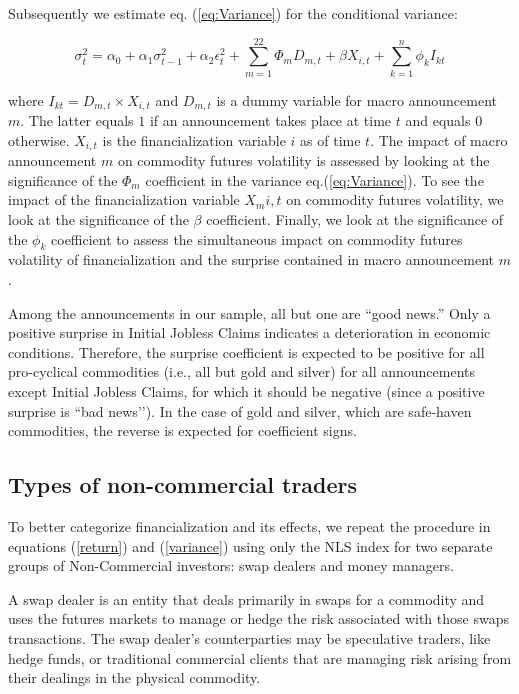 \documentclass[12pt]{article}
\begin{document}
Subsequently we estimate  eq. (\ref{eq:Variance}) for the conditional variance:

\begin{equation}\label{eq:Variance}
\sigma_{t}^2=\alpha_0+\alpha_1 \sigma_{t-1}^2+\alpha_2 \epsilon_t^2 +\sum_{m=1}^{22} \Phi_m D_{m,t}+\beta X_{i,t}+\sum_{k=1}^n \phi_k I_{kt}
\end{equation}

where $I_{kt}=D_{m,t} \times X_{i,t}$ and $D_{m,t}$ is a dummy variable for macro announcement $m$. The  latter equals $1$ if an announcement takes place at time $t$ and equals 0 otherwise. $X_{i,t}$  is the financialization variable $i$ as of  time $t$. The impact of macro announcement $m$ on commodity futures volatility is assessed by looking at the significance of the $\Phi_m$ coefficient in the variance eq.(\ref{eq:Variance}). To see the impact of the financialization variable $X_m{i,t}$ on commodity futures volatility, we look at the significance of the  $\beta$ coefficient. Finally, we look at the significance of the  $\phi_k$ coefficient to assess the simultaneous impact on commodity futures volatility of  financialization  and the surprise contained in macro announcement $m$. 

Among the announcements in our sample, all but one are ``good news.'' Only a positive surprise in Initial Jobless Claims indicates a deterioration in economic conditions. Therefore, the surprise coefficient is expected to be positive for all pro-cyclical commodities (i.e., all but gold and silver) for all announcements except Initial Jobless Claims, for which it should be negative (since a positive surprise is ``bad news’’). In the case of gold and silver, which are safe-haven commodities, the reverse is expected for coefficient signs.

\subsection{Types of non-commercial traders}
To better categorize financialization and its effects, we repeat the procedure in equations (\ref{return})  and (\ref{variance}) using only the NLS index for two separate groups of Non-Commercial investors: swap dealers and money managers. 

A swap dealer is an entity that deals primarily in swaps for a commodity and uses the futures markets to manage or hedge the risk associated with those swaps transactions. The swap dealer’s counterparties may be speculative traders, like hedge funds, or traditional commercial clients that are managing risk arising from their dealings in the physical commodity.
\end{document}
